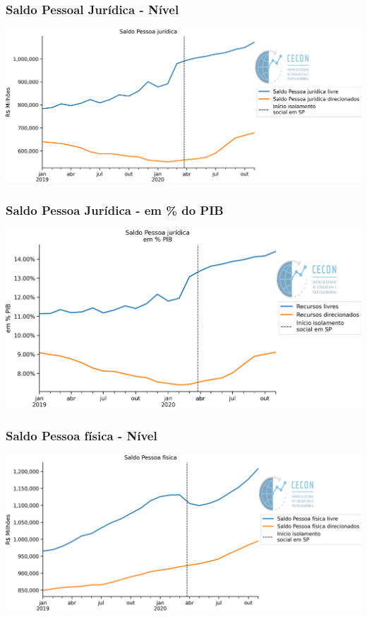 \documentclass{SelfArx}
\begin{document}
\subsubsection*{Saldo Pessoal Jurídica - Nível}
\label{sec:orgb941f69}

\begin{center}
\includegraphics[width=.9\linewidth]{./figs/Credito/SaldoPJ.png}
\end{center}



\subsubsection*{Saldo Pessoa Jurídica - em \% do PIB}
\label{sec:org7213fdc}
\begin{center}
\includegraphics[width=.9\linewidth]{./figs/Credito/SaldoPJ_PIB.png}
\end{center}

\subsubsection*{Saldo Pessoa física - Nível}
\label{sec:orgb25527b}

\begin{center}
\includegraphics[width=.9\linewidth]{./figs/Credito/SaldoPF.png}
\end{center}
\end{document}
